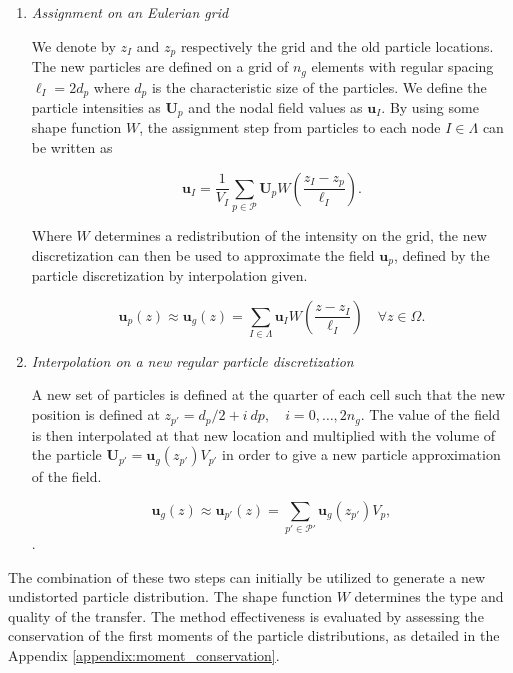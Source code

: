 \begin{enumerate}[label=(\alph*)]
	\item  \textit{Assignment on an Eulerian grid} \label{assigment}

	      We denote by $z_{I}$ and $z_{p}$ respectively the grid and the old particle locations. The new particles are defined on a grid of $n_g$ elements with regular spacing $\ell_I = 2 d_p$ where $d_p$ is the characteristic size of the particles. We define the particle intensities as $\bm U_p$ and the nodal field values as $\bm u_I$. By using some shape function $W$, the assignment step from particles to each node $I \in \Lambda$ can be written as

	      \begin{equation*}
		      \bm{u}_I = \frac1{V_I} \sum_{p \in \mathcal P} \bm U_p  W \left(\frac{z_I - z_p}{\ell_I} \right).
	      \end{equation*}

	      Where $W$ determines a redistribution of the intensity on the grid, the new discretization can then be used to approximate the field $\bm{u}_p$, defined by the particle discretization by interpolation given.

	      \begin{equation*}
		      \bm{u}_p(z) \approx \bm{u}_g(z) = \sum_{I \in \Lambda} \bm u_I W \left(\frac{z - z_I}{\ell_I} \right) \quad \forall z \in \Omega.
	      \end{equation*}
	\item  \textit{Interpolation on a new regular particle discretization} \label{interpolation}

	      A new set of particles is defined at the quarter of each cell such that the new position is defined at $z_{p'} = d_p/2 + i~dp, \quad i = 0,\dots, 2n_g $. The value of the field is then interpolated at that new location and multiplied with the volume of the particle $\bm{U}_{p'} = \bm  u_g(z_{p'}) V_{p'}$ in order to give a new particle approximation of the field.

	      \begin{equation*}
		      \bm{u}_g(z)  \approx \bm{u}_{p'}(z) = \sum_{p'\in\mathcal P'} \bm{u}_g(z_{p'}) V_p,
	      \end{equation*}.
\end{enumerate}

The combination of these two steps can initially be utilized to generate a new undistorted particle distribution.
The shape function $W$ determines the type and quality of the transfer. The method effectiveness is evaluated by assessing the conservation of the first moments of the particle distributions, as detailed in the Appendix \ref{appendix:moment_conservation}.

